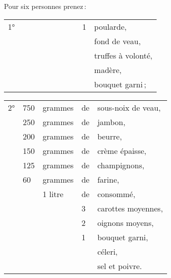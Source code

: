 Pour six personnes prenez :

\medskip

\footnotesize
\begin{longtable}{p{3em}p{2em}p{4em}p{1em}p{12em}}
     1° &     &         &  1 & poularde,                                                                  \\
        &     &         &    & fond de veau,                                                              \\
        &     &         &    & truffes à volonté,                                                         \\
        &     &         &    & madère,                                                                    \\
        &     &         &    & bouquet garni ;                                                            \\
\end{longtable}
\normalsize

\medskip

\footnotesize
\setlength\tabcolsep{.15em}
\begin{longtable}{p{3em}p{2em}p{4em}p{1em}p{12em}}
     2° & 750 & grammes & de & sous-noix de veau,                                                         \\
        & 250 & grammes & de & jambon,                                                                    \\
        & 200 & grammes & de & beurre,                                                                    \\
        & 150 & grammes & de & crème épaisse,                                                             \\
        & 125 & grammes & de & champignons,                                                               \\
        &  60 & grammes & de & farine,                                                                    \\
        &     & 1 litre & de & consommé,                                                                  \\
        &     &         &  3 & carottes moyennes,                                                         \\
        &     &         &  2 & oignons moyens,                                                            \\
        &     &         &  1 & bouquet garni,                                                             \\
        &     &         &    & céleri,                                                                    \\
        &     &         &    & sel et poivre.                                                             \\
\end{longtable}
\normalsize

